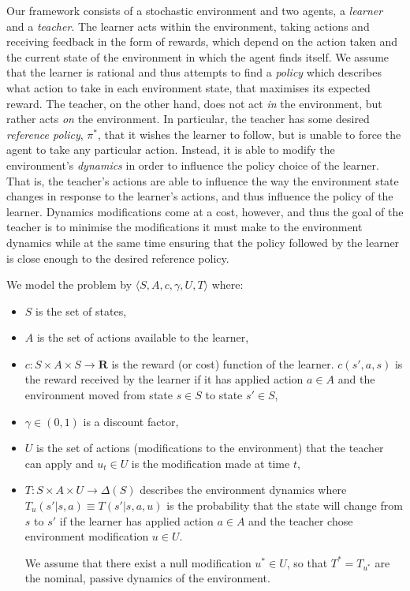 \documentclass[letterpaper]{aamas2010}
\begin{document}
Our framework consists of a stochastic environment and two agents, a
\emph{learner} and a \emph{teacher}.  The learner acts within the
environment, taking actions and receiving feedback in the form of
rewards, which depend on the action taken and the current state of the
environment in which the agent finds itself.  We assume that the
learner is rational and thus attempts to find a \emph{policy} which
describes what action to take in each environment state, that
maximises its expected reward.  The teacher, on the other hand, does
not act \emph{in} the environment, but rather acts \emph{on} the
environment.  In particular, the teacher has some desired
\emph{reference policy}, $\pi^*$, that it wishes the learner to
follow, but is unable to force the agent to take any particular
action.  Instead, it is able to modify the environment's
\emph{dynamics} in order to influence the policy choice of the
learner. That is, the teacher's actions are able to influence the way
the environment state changes in response to the learner's actions,
and thus influence the policy of the learner. Dynamics modifications
come at a cost, however, and thus the goal of the teacher is to
minimise the modifications it must make to the environment dynamics
while at the same time ensuring that the policy followed by the
learner is close enough to the desired reference policy.

We model the problem by $\langle S, A, c,\gamma, U,T\rangle$ where:
\begin{itemize}
\item $S$ is the set of states, 
\item $A$ is the set of actions available to the learner,
\item  $c:S\times A\times S\rightarrow\mathbf{R}$ is the reward (or
  cost) function of the learner. $c(s',a,s)$ is the reward received by
  the learner if it has applied action $a\in A$ and the environment
  moved from state $s\in S$ to state $s'\in S$,
\item $\gamma \in (0,1)$ is a discount factor,   

\item $U$ is the set of actions (modifications to the environment)
  that the teacher can apply and $u_t\in U$ is the modification made
  at time $t$,

\item $T:S\times A\times U\rightarrow\Delta(S)$ describes the
  environment dynamics where $T_u(s'|s,a)\equiv T(s'|s,a,u)$ is the
  probability that the state will change from $s$ to $s'$ if the
  learner has applied action $a\in A$ and the teacher chose
  environment modification $u\in U$.

 
We assume that there exist a null
  modification $u^*\in U$, so that $T^*=T_{u^*}$ are the nominal,
  passive dynamics of the environment.
\end{itemize}
\end{document}
